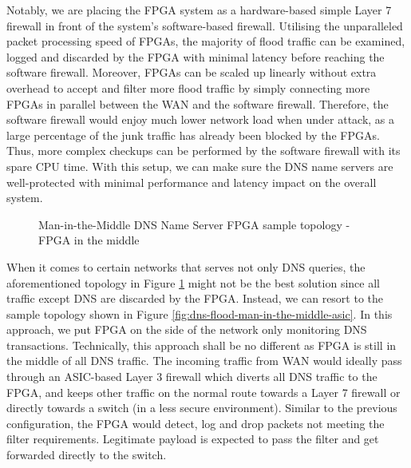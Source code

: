 \documentclass[a4paper]{report}
\begin{document}
Notably, we are placing the FPGA system as a hardware-based simple Layer 7 firewall in front of the system's software-based firewall. Utilising the unparalleled packet processing speed of FPGAs, the majority of flood traffic can be examined, logged and discarded by the FPGA with minimal latency before reaching the software firewall. Moreover, FPGAs can be scaled up linearly without extra overhead to accept and filter more flood traffic by simply connecting more FPGAs in parallel between the WAN and the software firewall. Therefore, the software firewall would enjoy much lower network load when under attack, as a large percentage of the junk traffic has already been blocked by the FPGAs. Thus, more complex checkups can be performed by the software firewall with its spare CPU time. With this setup, we can make sure the DNS name servers are well-protected with minimal performance and latency impact on the overall system.

\begin{figure}[H]
  \caption{Man-in-the-Middle DNS Name Server FPGA sample topology - FPGA in the middle}
  \label{fig:dns-flood-man-in-the-middle}
\end{figure}

When it comes to certain  networks that serves not only DNS queries, the aforementioned topology in Figure \ref{fig:dns-flood-man-in-the-middle} might not be the best solution since all traffic except DNS are discarded by the FPGA. Instead, we can resort to the sample topology shown in Figure \ref{fig:dns-flood-man-in-the-middle-asic}. In this approach, we put FPGA on the side of the network only monitoring DNS transactions. Technically, this approach shall be no different as FPGA is still in the middle of all DNS traffic. The incoming traffic from WAN would ideally pass through an ASIC-based Layer 3 firewall which diverts all DNS traffic to the FPGA, and keeps other traffic on the normal route towards a Layer 7 firewall or directly towards a switch (in a less secure environment). Similar to the previous configuration, the FPGA would detect, log and drop packets not meeting the filter requirements. Legitimate payload is expected to pass the filter and get forwarded directly to the switch.
\end{document}
